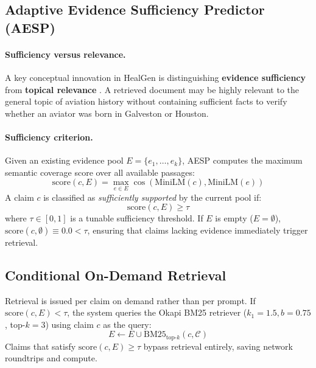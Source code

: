 \subsection{Adaptive Evidence Sufficiency Predictor (AESP)}
\paragraph{Sufficiency versus relevance.}
A key conceptual innovation in HealGen is distinguishing \textbf{evidence sufficiency} from \textbf{topical relevance} \cite{qiu2026surerag}. A retrieved document may be highly relevant to the general topic of aviation history without containing sufficient facts to verify whether an aviator was born in Galveston or Houston. 

\paragraph{Sufficiency criterion.}
Given an existing evidence pool $E = \{e_1, \dots, e_k\}$, AESP computes the maximum semantic coverage score over all available passages:
\begin{equation}
  \mathrm{score}(c, E) = \max_{e \in E} \cos(\mathrm{MiniLM}(c), \mathrm{MiniLM}(e))
\end{equation}
A claim $c$ is classified as \emph{sufficiently supported} by the current pool if:
\begin{equation}
  \mathrm{score}(c, E) \ge \tau
\end{equation}
where $\tau \in [0, 1]$ is a tunable sufficiency threshold. If $E$ is empty ($E = \emptyset$), $\mathrm{score}(c, \emptyset) \equiv 0.0 < \tau$, ensuring that claims lacking evidence immediately trigger retrieval.

\subsection{Conditional On-Demand Retrieval}
Retrieval is issued per claim on demand rather than per prompt. If $\mathrm{score}(c, E) < \tau$, the system queries the Okapi BM25 retriever ($k_1 = 1.5, b = 0.75$, top-$k = 3$) using claim $c$ as the query:
\begin{equation}
  E \leftarrow E \cup \mathrm{BM25}_{\text{top-}k}(c, \mathcal{C})
\end{equation}
Claims that satisfy $\mathrm{score}(c, E) \ge \tau$ bypass retrieval entirely, saving network roundtrips and compute.

